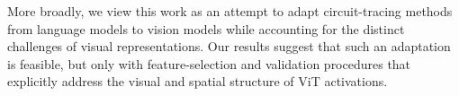 \documentclass[10pt]{article}
\begin{document}
More broadly, we view this work as an attempt to adapt circuit-tracing methods from language models to vision models while accounting for the distinct challenges of visual representations. Our results suggest that such an adaptation is feasible, but only with feature-selection and validation procedures that explicitly address the visual and spatial structure of ViT activations.
\end{document}

